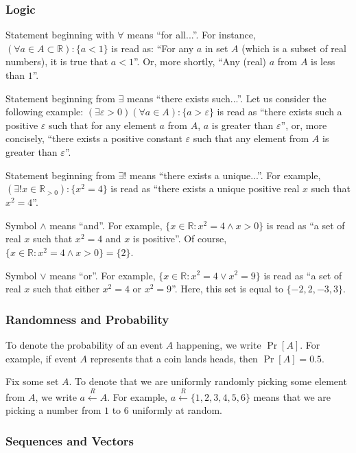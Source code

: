 \documentclass[../lecture-notes.tex]{subfiles}
\begin{document}
\subsubsection{Logic}

Statement beginning with $\forall$ means ``for all...''. For instance, $(\forall a \in A \subset \mathbb{R}): \{a < 1\}$ is read as: ``For any $a$ in set $A$ (which is a subset of real numbers), it is true that $a<1$''. Or, more shortly, ``Any (real) $a$ from $A$ is less than $1$''.

Statement beginning from $\exists$ means ``there exists such...''. Let us consider the following example: $(\exists \varepsilon > 0) (\forall a \in A): \{a > \varepsilon\}$ is read as ``there exists such a positive $\varepsilon$ such that for any element $a$ from $A$, $a$ is greater than $\varepsilon$'', or, more concisely, ``there exists a positive constant $\varepsilon$ such that any element from $A$ is greater than $\varepsilon$''.

Statement beginning from $\exists !$ means ``there exists a unique...''. For example, $(\exists! x \in \mathbb{R}_{>0}): \{x^2 = 4\}$ is read as ``there exists a unique positive real $x$ such that $x^2 = 4$''.

Symbol $\wedge$ means ``and''. For example, $\{x \in \mathbb{R}: x^2 = 4 \wedge x > 0\}$ is read as ``a set of real $x$ such that $x^2=4$ and $x$ is positive''. Of course, $\{x \in \mathbb{R}: x^2 = 4 \wedge x > 0\} = \{2\}$.

Symbol $\vee$ means ``or''. For example, $\{x \in \mathbb{R}: x^2 = 4 \vee x^2 = 9\}$ is read as ``a set of real $x$ such that either $x^2=4$ or $x^2=9$''. Here, this set is equal to $\{-2,2,-3,3\}$.

\subsubsection{Randomness and Probability}

To denote the probability of an event $A$ happening, we write $\Pr[A]$. For example, if event $A$ represents that a coin lands heads, then $\Pr[A] = 0.5$.

Fix some set $A$. To denote that we are uniformly randomly picking some element from $A$, we write $a \xleftarrow{R} A$. For example, $a \xleftarrow{R} \{1,2,3,4,5,6\}$ means that we are picking a number from $1$ to $6$ uniformly at random.

\subsubsection{Sequences and Vectors}
\end{document}
